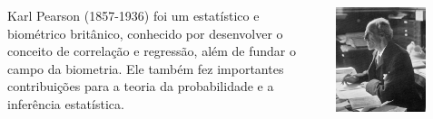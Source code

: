\documentclass[12pt]{beamer}
\begin{document}
\begin{frame}{}
	\begin{block}{}
		\begin{columns} %
			
			\begin{column}{0.6\textwidth} %
				\vfill
				\centering
				\justifying
				Karl Pearson (1857-1936) foi um estatístico e biométrico britânico, conhecido por desenvolver o conceito de correlação e regressão, além de fundar o campo da biometria. Ele também fez importantes contribuições para a teoria da probabilidade e a inferência estatística.
			\end{column}
			
			\begin{column}{0.3\textwidth} %
				\includegraphics[width=0.7\textwidth]{figs/KarlPearson.jpg} %
			\end{column}
			
		\end{columns}
	\end{block}
\end{frame}
\end{document}
